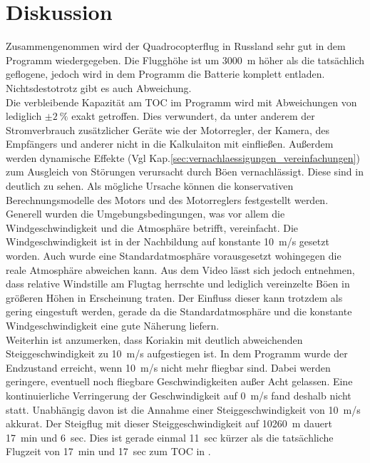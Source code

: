 \section{Diskussion}
\label{sec:nachbildung_diskussion}

Zusammengenommen wird der Quadrocopterflug in Russland sehr gut in dem Programm wiedergegeben. Die Flugghöhe ist um \SI{3000}{m} höher als die tatsächlich geflogene, jedoch wird in dem Programm die Batterie komplett entladen. Nichtsdestotrotz gibt es auch Abweichung.\\
Die verbleibende Kapazität am TOC im Programm wird mit Abweichungen von lediglich \ensuremath{\pm\SI{2}{\%}} exakt getroffen. Dies verwundert, da unter anderem der Stromverbrauch zusätzlicher Geräte wie der Motorregler, der Kamera, des Empfängers und anderer nicht in die Kalkulaiton mit einfließen. Außerdem werden dynamische Effekte (Vgl Kap.\ref{sec:vernachlaessigungen_vereinfachungen}) zum Ausgleich von Störungen verursacht durch Böen vernachlässigt. Diese sind in \cite{Anderson.2018} deutlich zu sehen. Als mögliche Ursache können die konservativen Berechnungsmodelle des Motors und des Motorreglers festgestellt werden. Generell wurden die Umgebungsbedingungen, was vor allem die Windgeschwindigkeit und die Atmosphäre betrifft, vereinfacht. Die Windgeschwindigkeit ist in der Nachbildung auf konstante \SI{10}{m/s} gesetzt worden. Auch wurde eine Standardatmosphäre vorausgesetzt wohingegen die reale Atmosphäre abweichen kann. Aus dem Video lässt sich jedoch entnehmen, dass relative Windstille am Flugtag herrschte und lediglich vereinzelte Böen in größeren Höhen in Erscheinung traten. Der Einfluss dieser kann trotzdem als gering eingestuft werden, gerade da die Standardatmosphäre und die konstante Windgeschwindigkeit eine gute Näherung liefern. \\
Weiterhin ist anzumerken, dass Koriakin mit deutlich abweichenden Steiggeschwindigkeit zu \SI{10}{m/s} aufgestiegen ist. In dem Programm wurde der Endzustand erreicht, wenn \SI{10}{m/s} nicht mehr fliegbar sind. Dabei werden geringere, eventuell noch fliegbare Geschwindigkeiten außer Acht gelassen. Eine kontinuierliche Verringerung der Geschwindigkeit auf \SI{0}{m/s} fand deshalb nicht statt. Unabhängig davon ist die Annahme einer Steiggeschwindigkeit von \SI{10}{m/s} akkurat. Der Steigflug mit dieser Steiggeschwindigkeit auf \SI{10260}{m} dauert \SI{17}{min} und \SI{6}{sec}. Dies ist gerade einmal \SI{11}{sec} kürzer als die tatsächliche Flugzeit von \SI{17}{min} und \SI{17}{sec} zum TOC in \cite{Anderson.2018}.\\
